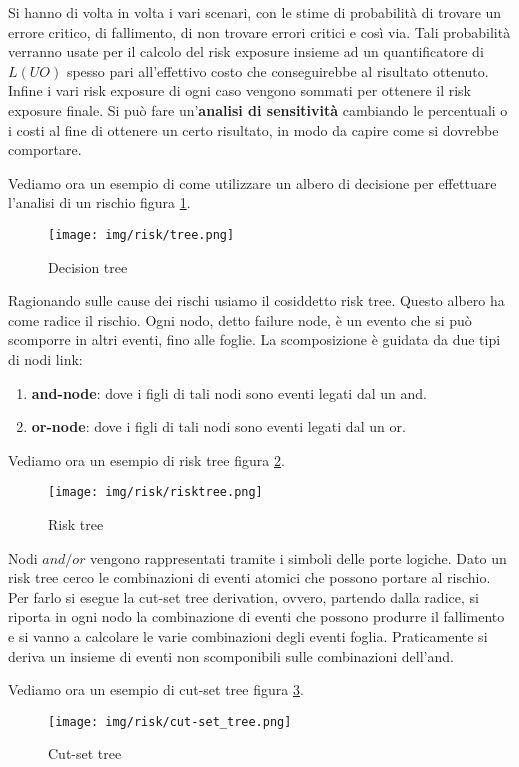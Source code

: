 Si hanno di volta in volta i vari scenari, con le stime di probabilità di trovare
un errore critico, di fallimento, di non trovare errori critici e così via. Tali
probabilità verranno usate per il calcolo del risk exposure insieme ad un
quantificatore di $L(UO)$ spesso pari all'effettivo costo che conseguirebbe al
risultato ottenuto. Infine i vari risk exposure di ogni caso vengono sommati per
ottenere il risk exposure finale. Si può fare un'\textbf{analisi di sensitività}
cambiando le percentuali o i costi al fine di ottenere un certo risultato, in
modo da capire come si dovrebbe comportare.
\begin{esempio}
    Vediamo ora un esempio di come utilizzare un albero di decisione per effettuare
    l'analisi di un rischio figura \ref{fig:tree}.
    \begin{figure}[!ht]
        \centering
        \texttt{[image: img/risk/tree.png]}
        \caption{Decision tree}
        \label{fig:tree}
    \end{figure}
\end{esempio}
\newpage
Ragionando sulle cause dei rischi usiamo il cosiddetto risk tree. Questo albero
ha come radice il rischio. Ogni nodo, detto failure node, è un evento che si può
scomporre in altri eventi, fino alle foglie. La scomposizione è guidata da due
tipi di nodi link:
\begin{enumerate}
    \item \textbf{and-node}: dove i figli di tali nodi sono eventi legati dal un
          and.
    \item \textbf{or-node}: dove i figli di tali nodi sono eventi legati dal un
          or.
\end{enumerate}
\begin{esempio}
    Vediamo ora un esempio di risk tree figura \ref{fig:risk-tree}.
    \begin{figure}[!ht]
        \centering
        \texttt{[image: img/risk/risktree.png]}
        \caption{Risk tree}
        \label{fig:risk-tree}
    \end{figure}
\end{esempio}
Nodi $and/or$ vengono rappresentati tramite i simboli delle porte logiche. Dato un
risk tree cerco le combinazioni di eventi atomici che possono portare al rischio.
Per farlo si esegue la cut-set tree derivation, ovvero, partendo dalla radice, si
riporta in ogni nodo la combinazione di eventi che possono produrre il fallimento
e si vanno a calcolare le varie combinazioni degli eventi foglia. Praticamente si
deriva un insieme di eventi non scomponibili sulle combinazioni dell'and.
\begin{esempio}
    Vediamo ora un esempio di cut-set tree figura \ref{fig:cut-set-tree}.
    \begin{figure}[!ht]
        \centering
        \texttt{[image: img/risk/cut-set\_tree.png]}
        \caption{Cut-set tree}
        \label{fig:cut-set-tree}
    \end{figure}
\end{esempio}
